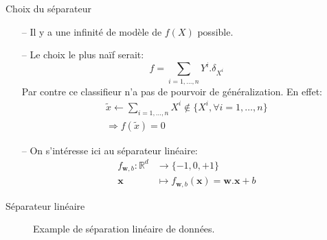 \documentclass[9pt]{beamer}
\begin{document}
	\begin{frame}{Choix du séparateur}
		\begin{itemize}
			\item[--] Il y a une infinité de modèle de $f(X)$ possible.
			\item[--] Le choix le plus naïf serait:
			\begin{equation*}
				f = \sum_{i=1,\dots,n} Y^i . \delta_{X^i}
			\end{equation*}
			Par contre ce classifieur n'a pas de pourvoir de généralization. En effet:
			\begin{gather*}
				\widetilde{x} \leftarrow \sum_{i=1,\dots,n} X^i \notin \{X^i, \forall i=1,\dots,n\} \\
				\Rightarrow f(\widetilde{x}) = 0
			\end{gather*}
			\item[--] On s'intéresse ici au séparateur linéaire:
			\begin{align*}
				f_{\textbf{w}, b}: \mathbb{R}^d &\rightarrow \{-1, 0, +1\} \\
				\textbf{x} &\mapsto f_{\textbf{w}, b}(\textbf{x}) = \textbf{w}.\textbf{x} + b
			\end{align*}
		\end{itemize}
	\end{frame}

	\begin{frame}{Séparateur linéaire}
		\begin{figure}[H]
			{
				\caption{\label{fig::lin_separators} Example de séparation linéaire de données.}
			}
		\end{figure}
	\end{frame}
\end{document}
